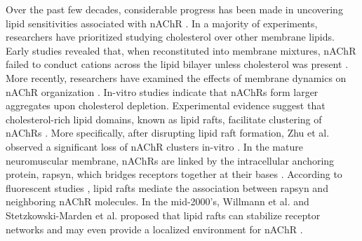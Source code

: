 Over the past few decades, considerable progress has been made in uncovering lipid sensitivities associated with nAChR \citep{Criado1982}. In a majority of experiments, researchers have prioritized studying cholesterol over other membrane lipids. Early studies revealed that, when reconstituted into membrane mixtures, nAChR failed to conduct cations across the lipid bilayer unless cholesterol was present  \citep{Fong1986,Sunshine1992,Butler1993,Fong1987,Corrie2002}. 
More recently, researchers have examined the effects of membrane dynamics on nAChR organization \citep{Baenziger2015,Bruses2001,Marchand2002,Oshikawa2003,Pato2008,Zhu2006a,Baenziger2017,Barrantes2007,Barrantes2000,Bermudez2010,Barrantes2010,Perillo2016,Wenz2005,Borroni2016,Unwin2017}. In-vitro studies \citep{Barrantes2007,Barrantes2010} indicate that nAChRs form larger aggregates upon cholesterol depletion. Experimental evidence suggest that cholesterol-rich lipid domains, known as lipid rafts, facilitate clustering of nAChRs \citep{Campagna2006,Marchand2002,Pato2008}. 
More specifically, after disrupting lipid raft formation, Zhu et al. observed a significant loss of nAChR clusters in-vitro \citep{Zhu2006a}. In the mature neuromuscular membrane, nAChRs are linked by the intracellular anchoring protein, rapsyn, which bridges receptors together at their bases  \citep{Zuber2013a}. According to fluorescent studies \citep{Marchand2002}, lipid rafts mediate the association between rapsyn and neighboring nAChR molecules. In the mid-2000's, Willmann et al. and Stetzkowski-Marden et al. proposed that lipid rafts can stabilize receptor networks and may even provide a localized environment for nAChR \citep{Willmann2006,Stetzkowski-Marden2006}. 

